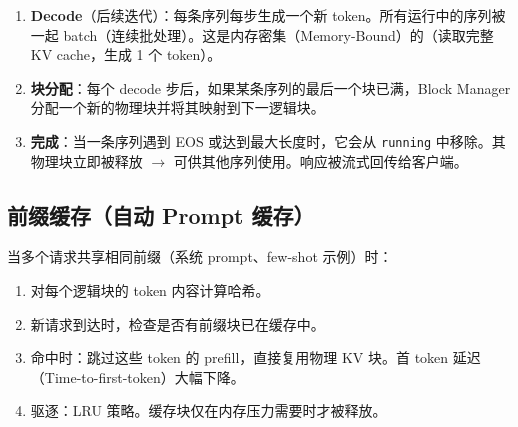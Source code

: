 \begin{enumerate}
  \item \textbf{Decode}（后续迭代）：每条序列每步生成一个新 token。所有运行中的序列被一起 batch（连续批处理）。这是内存密集（Memory-Bound）的（读取完整 KV cache，生成 1 个 token）。
  \item \textbf{块分配}：每个 decode 步后，如果某条序列的最后一个块已满，Block Manager 分配一个新的物理块并将其映射到下一逻辑块。
  \item \textbf{完成}：当一条序列遇到 EOS 或达到最大长度时，它会从 \texttt{running} 中移除。其物理块立即被释放 $\rightarrow$ 可供其他序列使用。响应被流式回传给客户端。
\end{enumerate}

\subsection{前缀缓存（自动 Prompt 缓存）}
\label{prefix-caching-automatic-prompt-caching}

当多个请求共享相同前缀（系统 prompt、few-shot 示例）时：

\begin{enumerate}
  \item 对每个逻辑块的 token 内容计算哈希。
  \item 新请求到达时，检查是否有前缀块已在缓存中。
  \item 命中时：跳过这些 token 的 prefill，直接复用物理 KV 块。首 token 延迟（Time-to-first-token）大幅下降。
  \item 驱逐：LRU 策略。缓存块仅在内存压力需要时才被释放。
\end{enumerate}

